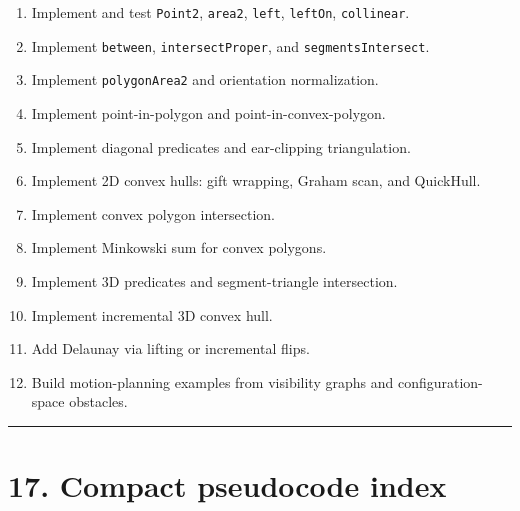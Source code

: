 \documentclass[11pt]{article}
\providecommand{\tightlist}{\setlength{\itemsep}{0pt}\setlength{\parskip}{0pt}}
\begin{document}
\begin{enumerate}
\def\labelenumi{\arabic{enumi}.}
\tightlist
\item
  Implement and test \texttt{Point2},
  \texttt{area2}, \texttt{left},
  \texttt{leftOn}, \texttt{collinear}.
\item
  Implement \texttt{between},
  \texttt{intersectProper}, and
  \texttt{segmentsIntersect}.
\item
  Implement \texttt{polygonArea2} and orientation
  normalization.
\item
  Implement point-in-polygon and point-in-convex-polygon.
\item
  Implement diagonal predicates and ear-clipping triangulation.
\item
  Implement 2D convex hulls: gift wrapping, Graham scan, and QuickHull.
\item
  Implement convex polygon intersection.
\item
  Implement Minkowski sum for convex polygons.
\item
  Implement 3D predicates and segment-triangle intersection.
\item
  Implement incremental 3D convex hull.
\item
  Add Delaunay via lifting or incremental flips.
\item
  Build motion-planning examples from visibility graphs and
  configuration-space obstacles.
\end{enumerate}

\begin{center}\rule{0.5\linewidth}{0.5pt}\end{center}

\section{17. Compact pseudocode index}\label{compact-pseudocode-index}
\end{document}
